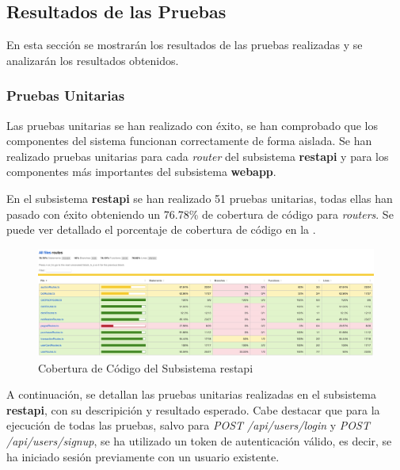 \subsection{Resultados de las Pruebas}
En esta sección se mostrarán los resultados de las pruebas realizadas y se analizarán los resultados obtenidos.

\subsubsection{Pruebas Unitarias}
Las pruebas unitarias se han realizado con éxito, se han comprobado que los componentes del sistema funcionan correctamente de forma aislada.
Se han realizado pruebas unitarias para cada \textit{router} del subsistema \textbf{restapi} y para los componentes más importantes del subsistema \textbf{webapp}. 

En el subsistema \textbf{restapi} se han realizado 51 pruebas unitarias, todas ellas han pasado con éxito obteniendo un 76.78\% de cobertura de código para \textit{routers}.
Se puede ver detallado el porcentaje de cobertura de código en la .
\begin{figure}[H]
    \hypertarget{fig:6_8_Cobertura-Code-Restapi}{}
    \centering
    \includegraphics[width=0.8\linewidth]{figures/6-Analisis/6-Pruebas/6_8-Coverage-Restapi.png}
    \caption{Cobertura de Código del Subsistema restapi}
    \label{fig:6_8_Cobertura-Code-Restapi}
\end{figure}

A continuación, se detallan las pruebas unitarias realizadas en el subsistema \textbf{restapi}, con su descripición y resultado esperado.
Cabe destacar que para la ejecución de todas las pruebas, salvo para \textit{POST /api/users/login} y \textit{POST /api/users/signup}, se ha utilizado un token de autenticación válido, 
es decir, se ha iniciado sesión previamente con un usuario existente.

